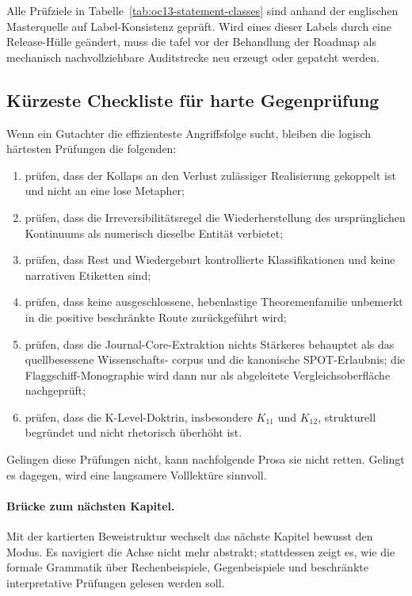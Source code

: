 Alle Prüfziele in Tabelle~\ref{tab:oc13-statement-classes} sind anhand der englischen Masterquelle
auf Label-Konsistenz geprüft. Wird eines dieser Labels durch eine Release-Hülle geändert, muss die
tafel vor der Behandlung der Roadmap als mechanisch nachvollziehbare Auditstrecke neu erzeugt oder
gepatcht werden.

\subsection{Kürzeste Checkliste für harte Gegenprüfung}

Wenn ein Gutachter die effizienteste Angriffsfolge sucht, bleiben die logisch härtesten Prüfungen
die folgenden:

\begin{enumerate}
\item prüfen, dass der Kollaps an den Verlust zulässiger Realisierung gekoppelt ist und nicht an eine lose Metapher;
\item prüfen, dass die Irreversibilitätsregel die Wiederherstellung des ursprünglichen Kontinuums als numerisch
      dieselbe Entität verbietet;
\item prüfen, dass Rest und Wiedergeburt kontrollierte Klassifikationen und keine narrativen Etiketten sind;
\item prüfen, dass keine ausgeschlossene, hebenlastige Theoremenfamilie unbemerkt in die positive beschränkte
      Route zurückgeführt wird;
\item prüfen, dass die Journal-Core-Extraktion nichts Stärkeres behauptet als das quellbesessene Wissenschafts-
      corpus und die kanonische SPOT-Erlaubnis; die Flaggschiff-Monographie wird dann nur als abgeleitete
      Vergleichsoberfläche nachgeprüft;
\item prüfen, dass die K-Level-Doktrin, insbesondere \(K_{11}\) und \(K_{12}\), strukturell begründet und nicht
      rhetorisch überhöht ist.
\end{enumerate}

Gelingen diese Prüfungen nicht, kann nachfolgende Prosa sie nicht retten. Gelingt
es dagegen, wird eine langsamere Volllektüre sinnvoll.

\paragraph{Brücke zum nächsten Kapitel.}
Mit der kartierten Beweistruktur wechselt das nächste Kapitel bewusst den Modus. Es navigiert die Achse nicht
mehr abstrakt; stattdessen zeigt es, wie die formale Grammatik über Rechenbeispiele, Gegenbeispiele
und beschränkte interpretative Prüfungen gelesen werden soll.

